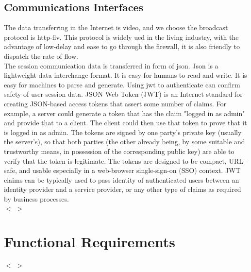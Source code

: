 \documentclass[16pt]{scrreprt}
\begin{document}
\subsection{Communications Interfaces}
The data transferring in the Internet is video, and we choose the broadcast protocol is http-flv. This protocol is widely ued in the living industry, with the advantage of low-delay and ease to go through the firewall, it is also friendly to dispatch the rate of flow. \\ 
The session communication data is transferred in form of json. Json is a lightweight data-interchange format. It is easy for humans to read and write. It is easy for machines to parse and generate. Using jwt to authenticate can confirm safety of user session data. JSON Web Token (JWT) is an Internet standard for creating JSON-based access tokens that assert some number of claims. For example, a server could generate a token that has the claim "logged in as admin" and provide that to a client. The client could then use that token to prove that it is logged in as admin. The tokens are signed by one party's private key (usually the server's), so that both parties (the other already being, by some suitable and trustworthy means, in possession of the corresponding public key) are able to verify that the token is legitimate. The tokens are designed to be compact, URL-safe, and usable especially in a web-browser single-sign-on (SSO) context. JWT claims can be typically used to pass identity of authenticated users between an identity provider and a service provider, or any other type of claims as required by business processes. \\
$<$ $>$

\section{Functional Requirements}
$<$ $>$
\end{document}
